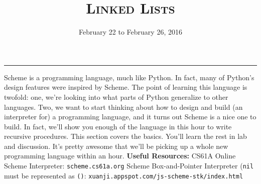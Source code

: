 \documentclass{exam}
\title{\textsc{Linked Lists}}
\date{February 22 to February 26, 2016}
\begin{document}
\maketitle
\rule{\textwidth}{0.15em}
\fontsize{12}{15}\selectfont




\begin{blocksection}
Scheme is a programming language, much like Python. In fact, many of Python's design features were inspired by Scheme. The point of learning this language is twofold: one, we're looking into what parts of Python generalize to other languages. Two, we want to start thinking about how to design and build (an interpreter  for) a programming language, and it turns out Scheme is a nice one to build. In fact, we'll show you enough of the language in this hour to write recursive procedures. This section covers the basics. You'll learn the rest in lab and discussion. It's pretty awesome that we'll be picking up a whole new programming language within an hour.
\newline
\newline
\textbf{Useful Resources:} \newline
CS61A Online Scheme Interpreter: \texttt{scheme.cs61a.org} \newline
Scheme Box-and-Pointer Interpreter (\texttt{nil} must be represented as \texttt{()}: \texttt{xuanji.appspot.com/js-scheme-stk/index.html \newline
}
\end{blocksection}
\end{document}
